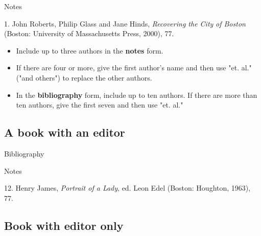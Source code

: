 \begin{singlespace}
\noindent{}
\end{singlespace}


\begin{center}{Notes}\end{center}
\begin{singlespace}
\noindent\hspace{1.2cm}1. John Roberts, Philip Glass and Jane Hinds,
\emph{Recovering the City} \emph{of Boston} (Boston: University of Massachusetts
Press, 2000), 77.
\end{singlespace}



\begin{itemize} \item Include up to three authors in the \textbf{notes} form.
\item If there are four or more, give the first author's name and then use "et.
al." ("and others") to replace the other authors.  \item In the
\textbf{bibliography} form, include up to ten authors. If there are more than
ten authors, give the first seven and then use "et. al." \end{itemize}

\subsection{A book with an editor}

    
\begin{center}{Bibliography}\end{center}
\begin{singlespace}
\noindent{}
\end{singlespace}

\begin{center}{Notes}\end{center}
\begin{singlespace}
\noindent\hspace{1.2cm}12. Henry James, \emph{Portrait of a Lady}, ed. Leon Edel
(Boston: Houghton, 1963), 77.
\end{singlespace}


\subsection{Book with editor only}

